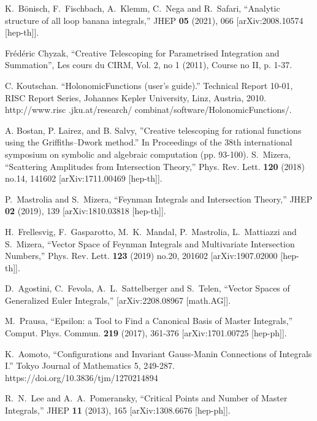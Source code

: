 \documentclass[a4paper,12pt]{article}
\numberwithin{equation}{section}
\numberwithin{figure}{section}
\begin{document}
\begin{thebibliography}{99}
K.~B\"onisch, F.~Fischbach, A.~Klemm, C.~Nega and R.~Safari,
``Analytic structure of all loop banana integrals,''
JHEP \textbf{05} (2021), 066
[arXiv:2008.10574 [hep-th]].

 Fr\'ed\'eric Chyzak, ``Creative Telescoping for
  Parametrised Integration and Summation'',  Les cours du CIRM,  Vol. 2, no 1 (2011), Course no II, p. 1-37.


 C. Koutschan. ``HolonomicFunctions (user's guide).'' Technical Report 10-01, RISC Report Series, Johannes Kepler University, Linz, Austria, 2010. http://www.risc
.jku.at/research/ combinat/software/HolonomicFunctions/.

 A. Bostan, P. Lairez, and B. Salvy,
  ''Creative telescoping for rational functions using the
  Griffiths--Dwork method.'' In Proceedings of the 38th international
  symposium on symbolic and algebraic computation (pp. 93-100). 
S.~Mizera,
``Scattering Amplitudes from Intersection Theory,''
Phys. Rev. Lett. \textbf{120} (2018) no.14, 141602
[arXiv:1711.00469 [hep-th]].

P.~Mastrolia and S.~Mizera,
``Feynman Integrals and Intersection Theory,''
JHEP \textbf{02} (2019), 139
[arXiv:1810.03818 [hep-th]].

H.~Frellesvig, F.~Gasparotto, M.~K.~Mandal, P.~Mastrolia, L.~Mattiazzi and S.~Mizera,
``Vector Space of Feynman Integrals and Multivariate Intersection Numbers,''
Phys. Rev. Lett. \textbf{123} (2019) no.20, 201602
[arXiv:1907.02000 [hep-th]].

D.~Agostini, C.~Fevola, A.~L.~Sattelberger and S.~Telen,
``Vector Spaces of Generalized Euler Integrals,''
[arXiv:2208.08967 [math.AG]].

  
M.~Prausa,
``Epsilon: a Tool to Find a Canonical Basis of Master Integrals,''
Comput. Phys. Commun. \textbf{219} (2017), 361-376
[arXiv:1701.00725 [hep-ph]].

  K.~Aomoto, ``Configurations and Invariant Gauss-Manin Connections of Integrals I.'' Tokyo Journal of Mathematics 5, 249-287. https://doi.org/10.3836/tjm/1270214894



R.~N.~Lee and A.~A.~Pomeransky,
``Critical Points and Number of Master Integrals,''
JHEP \textbf{11} (2013), 165
[arXiv:1308.6676 [hep-ph]].
  

\end{thebibliography}
\end{document}
